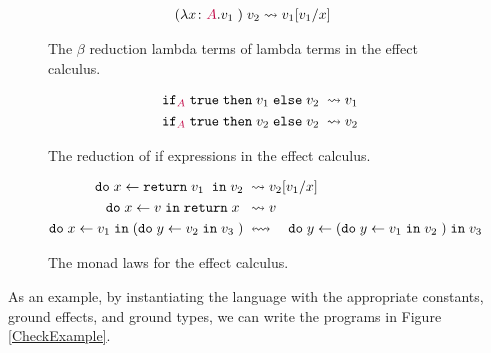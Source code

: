 \documentclass{Report}
\begin{document}
\begin{figure}
    \begin{framed}
        \begin{align*}
            \apply{(\lam{x}{A}{v_1})}{v_2} & \rightsquigarrow v_1\ssub{x}{v_1}
        \end{align*}
    \end{framed}
    \caption{The $\beta$ reduction lambda terms of lambda terms in the effect calculus.}
    \label{ECBeta}
\end{figure}

\begin{figure}
    \begin{framed}
        \begin{align*}
            \pifthenelse{A}{\t}{v_1}{v_2} & \rightsquigarrow v_1\\
            \pifthenelse{A}{\t}{v_2}{v_2} & \rightsquigarrow v_2\\
        \end{align*}
    \end{framed}
    \caption{The reduction of if expressions in the effect calculus.}
    \label{ECIf}
\end{figure}


\begin{figure}
    \begin{framed}
        \begin{align*}
            \doin{x}{\return{v_1}}{v_2} & \rightsquigarrow v_2\ssub{x}{v_1}\\
            \doin{x}{v}{\return{x}} & \rightsquigarrow v\\
            \doin{x}{v_1}{(\doin{y}{v_2}{v_3})} 
            & \leftrightsquigarrow\quad  \doin{y}{(\doin{y}{v_1}{v_2})}{v_3}
        \end{align*}
    \end{framed}
    \caption{The monad laws for the effect calculus.}
    \label{ECMonads}
\end{figure}



As an example, by instantiating the language with the appropriate constants, ground effects, and ground types, we can write the programs in Figure \ref{CheckExample}.
\end{document}
